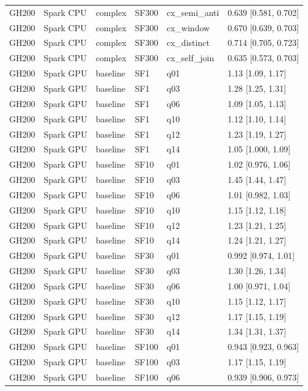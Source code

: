 \begin{longtable}{llllll}
GH200 & Spark CPU & complex & SF300 & cx\_semi\_anti & 0.639 [0.581, 0.702] \\
GH200 & Spark CPU & complex & SF300 & cx\_window & 0.670 [0.639, 0.703] \\
GH200 & Spark CPU & complex & SF300 & cx\_distinct & 0.714 [0.705, 0.723] \\
GH200 & Spark CPU & complex & SF300 & cx\_self\_join & 0.635 [0.573, 0.703] \\
GH200 & Spark GPU & baseline & SF1 & q01 & 1.13 [1.09, 1.17] \\
GH200 & Spark GPU & baseline & SF1 & q03 & 1.28 [1.25, 1.31] \\
GH200 & Spark GPU & baseline & SF1 & q06 & 1.09 [1.05, 1.13] \\
GH200 & Spark GPU & baseline & SF1 & q10 & 1.12 [1.10, 1.14] \\
GH200 & Spark GPU & baseline & SF1 & q12 & 1.23 [1.19, 1.27] \\
GH200 & Spark GPU & baseline & SF1 & q14 & 1.05 [1.000, 1.09] \\
GH200 & Spark GPU & baseline & SF10 & q01 & 1.02 [0.976, 1.06] \\
GH200 & Spark GPU & baseline & SF10 & q03 & 1.45 [1.44, 1.47] \\
GH200 & Spark GPU & baseline & SF10 & q06 & 1.01 [0.982, 1.03] \\
GH200 & Spark GPU & baseline & SF10 & q10 & 1.15 [1.12, 1.18] \\
GH200 & Spark GPU & baseline & SF10 & q12 & 1.23 [1.21, 1.25] \\
GH200 & Spark GPU & baseline & SF10 & q14 & 1.24 [1.21, 1.27] \\
GH200 & Spark GPU & baseline & SF30 & q01 & 0.992 [0.974, 1.01] \\
GH200 & Spark GPU & baseline & SF30 & q03 & 1.30 [1.26, 1.34] \\
GH200 & Spark GPU & baseline & SF30 & q06 & 1.00 [0.971, 1.04] \\
GH200 & Spark GPU & baseline & SF30 & q10 & 1.15 [1.12, 1.17] \\
GH200 & Spark GPU & baseline & SF30 & q12 & 1.17 [1.15, 1.19] \\
GH200 & Spark GPU & baseline & SF30 & q14 & 1.34 [1.31, 1.37] \\
GH200 & Spark GPU & baseline & SF100 & q01 & 0.943 [0.923, 0.963] \\
GH200 & Spark GPU & baseline & SF100 & q03 & 1.17 [1.15, 1.19] \\
GH200 & Spark GPU & baseline & SF100 & q06 & 0.939 [0.906, 0.973] \\

\end{longtable}
